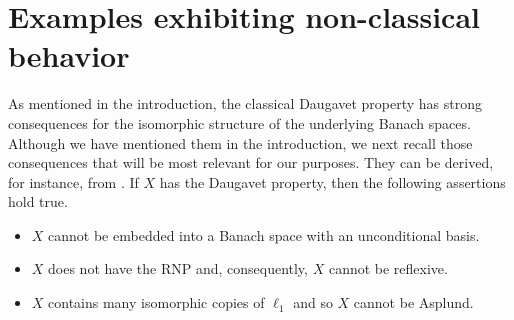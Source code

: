 \documentclass[a4paper,12pt]{amsart}
\theoremstyle{definition}
\theoremstyle{definition}
\theoremstyle{remark}
\newtheorem{remark}[theorem]{Remark}
\numberwithin{equation}{section}
\newcommand{\<}{\langle}
\renewcommand{\>}{\rangle}
\begin{document}
	
	
	
	\section{Examples exhibiting non-classical behavior} \label{section:far-classical}
	
	
	As mentioned in the introduction, the classical Daugavet property has strong consequences for the isomorphic structure of the underlying Banach spaces. Although we have mentioned them in the introduction, we next recall those consequences that will be most relevant for our purposes. They can be derived, for instance, from \cite{Kadets2000}. If $X$ has the Daugavet property, then the following assertions hold true.
	
	\begin{itemize}
		\item $X$ cannot be embedded into a Banach space with an unconditional basis.
		\item $X$ does not have the RNP and, consequently, $X$ cannot be reflexive.
		\item $X$ contains many isomorphic copies of $\ell_1$ and so $X$ cannot be Asplund.
	\end{itemize}
	
\end{document}
